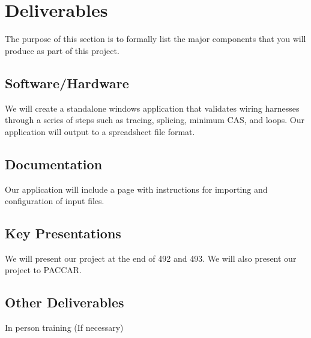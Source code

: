 \section{Deliverables}
 The purpose of this section is to formally list the major components that you
 will produce as part of this project.  

\subsection{Software/Hardware}
 We will create a standalone windows application that validates wiring harnesses
 through a series of steps such as tracing, splicing, minimum CAS, and loops.
 Our application will output to a spreadsheet file format.

\subsection{Documentation}
Our application will include a page with instructions for importing and configuration of
input files.

\subsection{Key Presentations}
 We will present our project at the end of 492 and 493.
 We will also present our project to PACCAR.

\subsection{Other Deliverables}
 In person training (If necessary)
